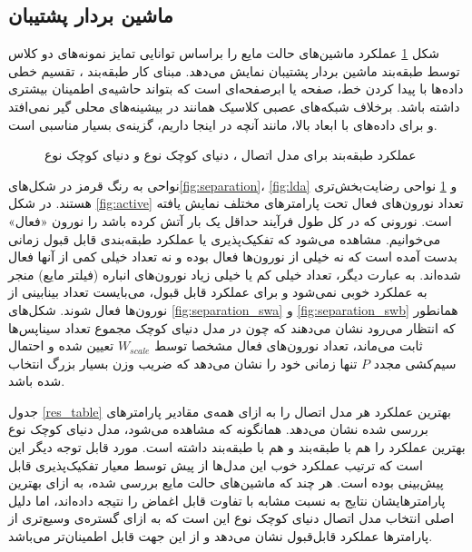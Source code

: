 \subsection{ماشین بردار پشتیبان} 
شکل \ref{fig:svm} عملکرد ماشین‌های حالت مایع را براساس توانایی تمایز نمونه‌های دو کلاس توسط طبقه‌بند ماشین بردار پشتیبان نمایش می‌دهد. مبنای کار طبقه‌بند ، تقسیم خطی داده‌ها با پیدا کردن خط، صفحه یا ابرصفحه‌ای است که بتواند حاشیه‌ی اطمینان بیشتری داشته باشد.  برخلاف شبکه‌های عصبی کلاسیک همانند  در بیشینه‌های محلی گیر نمی‌افتد و برای داده‌های با ابعاد بالا، مانند آنچه در اینجا داریم، گزینه‌ی بسیار مناسبی است.


\begin{figure}
\centering
{\footnotesize
{}

\caption[عملکرد طبقه‌بند  برای مدل‌های اتصال]{عملکرد طبقه‌بند  برای مدل اتصال  ،  دنیای کوچک نوع  و   دنیای کوچک نوع }
\label{fig:svm}
}
\end{figure}

نواحی به رنگ قرمز در شکل‌های\ref{fig:separation}، \ref{fig:lda} و \ref{fig:svm} نواحی رضایت‌بخش‌تری هستند. در شکل \ref{fig:active} تعداد نورون‌های فعال تحت پارامترهای مختلف نمایش یافته است. نورونی که در کل طول فرآیند حداقل یک بار آتش کرده باشد را نورون «فعال» می‌خوانیم. مشاهده می‌شود که تفکیک‌پذیری یا عملکرد طبقه‌بندی قابل قبول زمانی بدست آمده است که نه خیلی از نورون‌ها فعال بوده و نه تعداد خیلی کمی از آنها فعال شده‌اند. به عبارت دیگر، تعداد خیلی کم یا خیلی زیاد نورون‌های انباره (فیلتر مایع) منجر به عملکرد خوبی نمی‌شود و برای عملکرد قابل قبول، می‌بایست تعداد بینابینی از نورون‌ها فعال شوند. شکل‌های \ref{fig:separation_swa} و \ref{fig:separation_swb} همانطور که انتظار می‌رود نشان می‌دهند که چون در مدل دنیای کوچک مجموع تعداد سیناپس‌ها ثابت می‌ماند، تعداد نورون‌های فعال مشخصا توسط $W_{scale}$  تعیین شده و احتمال سیم‌کشی مجدد $P$ تنها زمانی خود را نشان می‌دهد که ضریب وزن بسیار بزرگ انتخاب شده باشد. 

جدول \ref{res_table} بهترین عملکرد هر مدل اتصال را به ازای همه‌ی مقادیر پارامترهای بررسی شده نشان می‌دهد. همانگونه که مشاهده می‌شود، مدل دنیای کوچک نوع  بهترین عملکرد را هم با طبقه‌بند  و هم با طبقه‌بند  داشته است. مورد قابل توجه دیگر این است که ترتیب عملکرد خوب این مدل‌ها از پیش توسط معیار تفکیک‌پذیری قابل پیش‌بینی بوده است. هر چند که ماشین‌های حالت مایع بررسی شده، به ازای بهترین پارامتر‌هایشان نتایج به نسبت مشابه با تفاوت قابل اغماض را نتیجه داده‌اند، اما دلیل اصلی انتخاب مدل اتصال دنیای کوچک نوع  این است که به ازای گستره‌ی وسیع‌تری از پارامتر‌ها عملکرد قابل‌قبول نشان می‌دهد و از این جهت قابل اطمینان‌تر می‌باشد.

